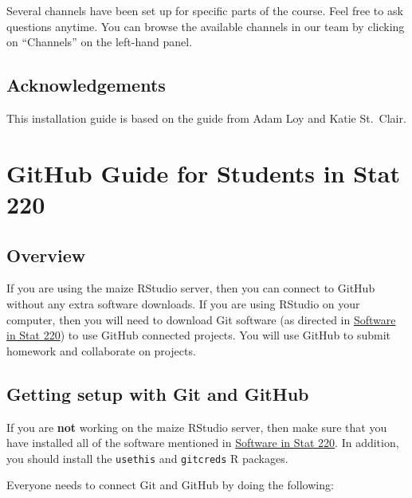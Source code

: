 \documentclass[
]{book}
\begin{document}
Several channels have been set up for specific parts of the course. Feel
free to ask questions anytime. You can browse the available channels in
our team by clicking on ``Channels'' on the left-hand panel.

\hypertarget{acknowledgements}{%
\section{Acknowledgements}\label{acknowledgements}}

This installation guide is based on the guide from Adam Loy and Katie St.~Clair.

\hypertarget{github}{%
\chapter{GitHub Guide for Students in Stat 220}\label{github}}

\hypertarget{overview}{%
\section{Overview}\label{overview}}

If you are using the maize RStudio server, then you can connect to
GitHub without any extra software downloads. If you are using RStudio on
your computer, then you will need to download Git software (as directed
in \protect\hyperlink{software}{Software in Stat 220}) to use GitHub connected
projects. You will use GitHub to submit homework and collaborate on projects.

\hypertarget{getting-setup-with-git-and-github}{%
\section{Getting setup with Git and GitHub}\label{getting-setup-with-git-and-github}}

If you are \textbf{not} working on the maize RStudio server, then make sure
that you have installed all of the software mentioned in \protect\hyperlink{software}{Software in Stat 220}. In addition, you should install the \texttt{usethis} and \texttt{gitcreds} R packages.

Everyone needs to connect Git and GitHub by doing the following:
\end{document}
